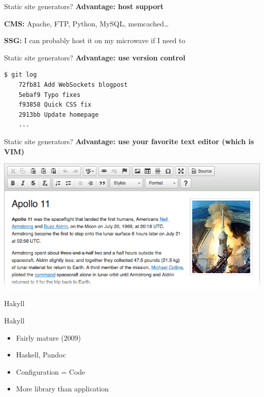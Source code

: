 \documentclass[20pt]{beamer}
\newcommand{\vspaced}{
    \vspace{5mm}
}
\newcommand{\chapterslide}[1]{
    {
        \begin{frame}[plain]
        \begin{center}
        \large{#1}
        \end{center}
        \end{frame}
    }
}
\begin{document}
\begin{frame}{Static site generators?}
    \textbf{Advantage: host support} \\
    \vspaced
    \textbf{CMS:} Apache, FTP, Python, MySQL, memcached\ldots \\
    \vspaced
    \textbf{SSG:} I can probably host it on my microwave if I need to
\end{frame}

\begin{frame}[fragile]{Static site generators?}
    \textbf{Advantage: use version control} \\
    \vspaced
    \begin{lstlisting}[language=bash]
    $ git log
    72fb81 Add WebSockets blogpost
    5ebaf9 Typo fixes
    f93858 Quick CSS fix
    2913bb Update homepage
    ...
    \end{lstlisting}
\end{frame}

\begin{frame}{Static site generators?}
    \textbf{Advantage: use your favorite text editor (which is VIM)} \\
    \vspaced
    \includegraphics[width=\textwidth]{images/wysiwyg.png}
\end{frame}

\chapterslide{Hakyll}

\begin{frame}{Hakyll}
    \begin{itemize}
    \item Fairly mature (2009)
    \item Haskell, Pandoc
    \item Configuration = Code
    \item More library than application
    \end{itemize}
\end{frame}
\end{document}
